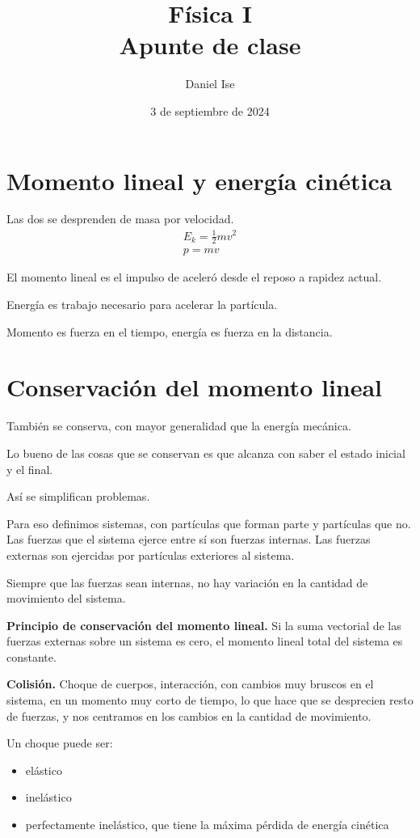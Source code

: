 \documentclass[12pt]{article}
\title{Física I\\Apunte de clase}
\author{Daniel Ise}
\date{3 de septiembre de 2024}
\begin{document}
\maketitle

\tableofcontents

\section{Momento lineal y energía cinética}

Las dos se desprenden de masa por velocidad.
\begin{align*}
    E_{k} = \frac{1}{2}mv^{2}\\
    p = mv
\end{align*}

El momento lineal es el impulso de aceleró desde el reposo a rapidez actual.

Energía es trabajo necesario para acelerar la partícula.

Momento es fuerza en el tiempo, energía es fuerza en la distancia.

\section{Conservación del momento lineal}

También se conserva,
con mayor generalidad que la energía mecánica.

Lo bueno de las cosas que se conservan es que alcanza con saber 
el estado inicial y el final.

Así se simplifican problemas.

Para eso definimos sistemas, 
con partículas que forman parte y partículas que no.
Las fuerzas que el sistema ejerce entre sí son fuerzas internas.
Las fuerzas externas son ejercidas por partículas exteriores al sistema.

Siempre que las fuerzas sean internas, 
no hay variación en la cantidad de movimiento del sistema.

\textbf{Principio de conservación del momento lineal.}
Si la suma vectorial de las fuerzas externas
sobre un sistema es cero,
el momento lineal total del sistema es constante.

\textbf{Colisión.}
Choque de cuerpos,
interacción,
con cambios muy bruscos en el sistema,
en un momento muy corto de tiempo,
lo que hace que se desprecien resto de fuerzas,
y nos centramos en los cambios en la cantidad de movimiento.

Un choque puede ser:
\begin{itemize}
    \item elástico
    \item inelástico
    \item perfectamente inelástico, que tiene la máxima pérdida de energía cinética
\end{itemize}
\end{document}
